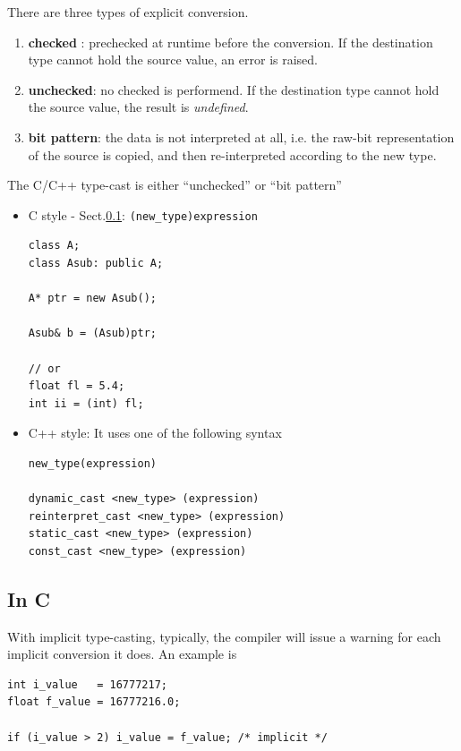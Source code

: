 There are three types of explicit conversion.
\begin{enumerate}
  \item {\bf checked} : prechecked at runtime before the conversion. If the
  destination type cannot hold the source value, an error is raised. 
  
  \item {\bf unchecked}: no checked is performend. If the destination type
  cannot hold the source value, the result is {\it undefined}. 
  
  \item {\bf bit pattern}:  the data is not interpreted at all, i.e. the raw-bit
  representation of the source is copied, and then re-interpreted according to
  the new type. 
\end{enumerate}

The C/C++ type-cast is either ``unchecked'' or ``bit pattern''
\begin{itemize}

  \item C style - Sect.\ref{sec:type-cast-C}: \verb!(new_type)expression!

\begin{lstlisting}
class A;
class Asub: public A;

A* ptr = new Asub();

Asub& b = (Asub)ptr;

// or 
float fl = 5.4;
int ii = (int) fl; 
\end{lstlisting}  

  \item C++ style: It uses one of the following syntax
  
\begin{Verbatim}
new_type(expression)
    
dynamic_cast <new_type> (expression)
reinterpret_cast <new_type> (expression)
static_cast <new_type> (expression)
const_cast <new_type> (expression)
 \end{Verbatim}
\end{itemize}


\subsection{In C}
\label{sec:type-cast-C}

With implicit type-casting, typically, the compiler will issue a warning for
each implicit conversion it does. An example is 
\begin{verbatim}
int i_value   = 16777217;
float f_value = 16777216.0;
    
if (i_value > 2) i_value = f_value; /* implicit */    
\end{verbatim}

